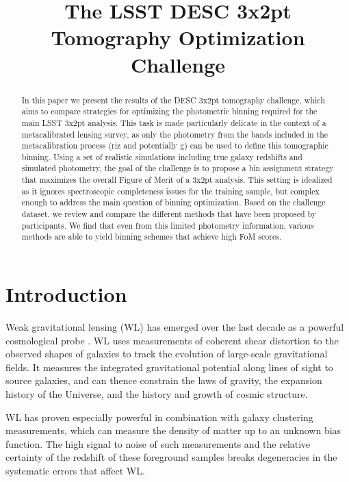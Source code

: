 \documentclass[twocolumn,twocolappendix]{aastex63}
\begin{document}
\title{The LSST DESC 3x2pt Tomography Optimization Challenge}


\begin{abstract}
In this paper we present the results of the DESC 3x2pt tomography challenge, which aims to compare strategies for optimizing the photometric binning required for the main LSST 3x2pt analysis. This task is made particularly delicate in the context of a metacalibrated lensing survey, as only the photometry from the bands  included in the metacalibration process (riz and potentially g) can be used to define this tomographic binning. Using a set of realistic simulations including true galaxy redshifts and simulated photometry, the goal of the challenge is to propose a bin assignment strategy that maximizes the overall Figure of Merit of a 3x2pt analysis. This setting is idealized as it ignores spectroscopic completeness  issues for the training sample, but complex enough to address the main question of binning optimization. Based on the challenge dataset, we review and compare the different methods that have been proposed by participants. We find that even from this limited photometry information, various methods are able to yield binning schemes that achieve high FoM scores.
\end{abstract}





\section{Introduction}
Weak gravitational lensing (WL) has emerged over the last decade as a powerful
cosmological probe \citep{cfhtlens,des,kids,hsc}.  WL
uses measurements of coherent shear distortion to the observed shapes of galaxies
to track the evolution of large-scale gravitational fields.  It measures the integrated
gravitational potential along lines of sight to source galaxies, and can thence constrain
the laws of gravity, the expansion history of the Universe, and the history and growth
of cosmic structure.

WL has proven especially powerful in combination with galaxy clustering measurements,
which can measure the density of matter up to an unknown bias function.  The high signal
to noise of such measurements and the relative certainty of the redshift of these foreground
samples breaks degeneracies in the systematic errors that affect WL.
\end{document}
